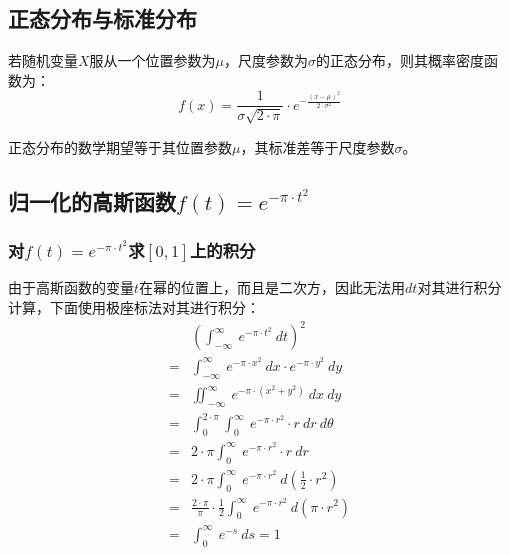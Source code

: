 \subsection{正态分布与标准分布}
若随机变量$X$服从一个位置参数为$\mu$，尺度参数为$\sigma$的正态分布，则其概率密度函数为：
$$
	f(x)=\frac{1}{\sigma\sqrt{2\cdot \pi}}\cdot e^{-\frac{(x-\mu)^2}{2\cdot \sigma^2}}
$$

正态分布的数学期望等于其位置参数$\mu$，其标准差等于尺度参数$\sigma$。
\subsection{归一化的高斯函数$f(t)=e^{-\pi\cdot t^2}$}
\subsubsection{对$f(t)=e^{-\pi\cdot t^2}$求$[0,1]$上的积分}
由于高斯函数的变量$t$在幂的位置上，而且是二次方，因此无法用$dt$对其进行积分计算，下面使用极座标法对其进行积分：
\begin{align*}
	  & (\int_{-\infty}^{\infty}\ e^{-\pi\cdot t^2}\ dt)^2                                        \\
	= & \int_{-\infty}^{\infty}\ e^{-\pi\cdot x^2}\ dx\cdot e^{-\pi\cdot y^2}\ dy                 \\
	= & \iint_{-\infty}^{\infty}\ e^{-\pi\cdot (x^2+y^2)}\ dx\ dy                                 \\
	= & \int_0^{2\cdot \pi} \int_0^{\infty}\ e^{-\pi\cdot r^2}\cdot r\ dr\ d\theta                \\
	= & 2\cdot \pi \int_0^{\infty}\ e^{-\pi\cdot r^2}\cdot r\ dr                                  \\
	= & 2\cdot \pi \int_0^{\infty}\ e^{-\pi\cdot r^2}\ d(\frac{1}{2}\cdot r^2)                    \\
	= & \frac{2\cdot \pi}{\pi}\cdot\frac{1}{2}\int_0^{\infty}\ e^{-\pi\cdot r^2}\ d(\pi\cdot r^2) \\
	= & \int_0^{\infty}\ e^{-s}\ ds=1
\end{align*}

